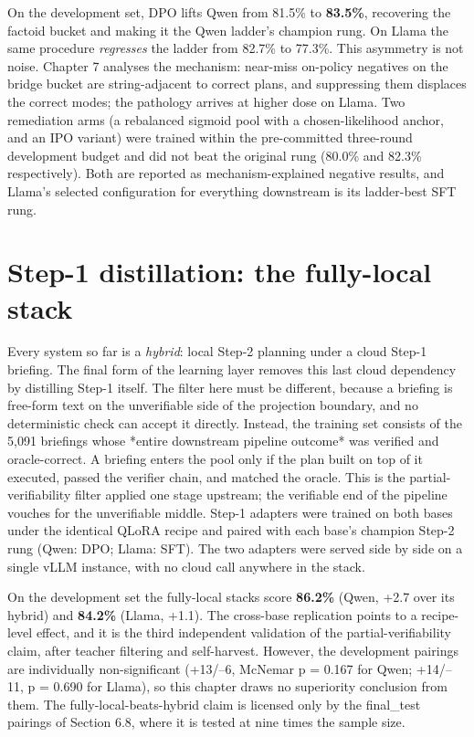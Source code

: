 \documentclass[10pt]{article} %
\begin{document}
On the development set, DPO lifts Qwen from 81.5\% to \textbf{83.5\%}, recovering the factoid bucket
and making it the Qwen ladder's champion rung. On Llama the same procedure \emph{regresses} the
ladder from 82.7\% to 77.3\%. This asymmetry is not noise. Chapter 7 analyses the mechanism:
near-miss on-policy negatives on the bridge bucket are string-adjacent to correct plans, and
suppressing them displaces the correct modes; the pathology arrives at higher dose on Llama.
Two remediation arms (a rebalanced sigmoid pool with a chosen-likelihood anchor, and an IPO
variant) were trained within the pre-committed three-round development budget and did not beat
the original rung (80.0\% and 82.3\% respectively). Both are reported as mechanism-explained
negative results, and Llama's selected configuration for everything downstream is its
ladder-best SFT rung.

\section{Step-1 distillation: the fully-local stack}\label{sec:step-1-distillation-the-fully-local-stac}

Every system so far is a \emph{hybrid}: local Step-2 planning under a cloud Step-1 briefing. The
final form of the learning layer removes this last cloud dependency by distilling Step-1
itself. The filter here must be different, because a briefing is free-form text on the
unverifiable side of the projection boundary, and no deterministic check can accept it
directly. Instead, the training set consists of the 5,091 briefings whose *entire downstream
pipeline outcome* was verified and oracle-correct. A briefing enters the pool only if the plan
built on top of it executed, passed the verifier chain, and matched the oracle. This is the
partial-verifiability filter applied one stage upstream; the verifiable end of the pipeline
vouches for the unverifiable middle. Step-1 adapters were trained on both bases under the
identical QLoRA recipe and paired with each base's champion Step-2 rung (Qwen: DPO; Llama:
SFT). The two adapters were served side by side on a single vLLM instance, with no cloud call
anywhere in the stack.

On the development set the fully-local stacks score \textbf{86.2\%} (Qwen, +2.7 over its hybrid) and
\textbf{84.2\%} (Llama, +1.1). The cross-base replication points to a recipe-level effect, and it is
the third independent validation of the partial-verifiability claim, after teacher filtering
and self-harvest. However, the development pairings are individually non-significant
(+13/--6, McNemar p = 0.167 for Qwen; +14/--11, p = 0.690 for Llama), so this chapter draws no
superiority conclusion from them. The fully-local-beats-hybrid claim is licensed only by the
final\_test pairings of Section 6.8, where it is tested at nine times the sample size.
\end{document}
